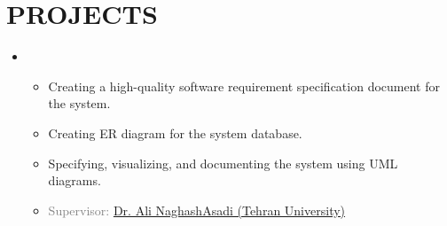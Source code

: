 \documentclass[11pt,letter,sans]{moderncv} %
\begin{document}
\section{PROJECTS}
    \begin{itemize}
        \item 
            \begin{itemize}
                \item Creating a high-quality software requirement specification document for the system.
                \item Creating ER diagram for the system database.
                \item Specifying, visualizing, and documenting the system using UML diagrams.
                \item \textcolor{gray}{Supervisor: \href{https://profile.ut.ac.ir/en/~naghashasadi}{Dr. Ali NaghashAsadi  (Tehran University)}}
            \end{itemize}
        \vspace{0.5em}
        

\end{itemize}
\end{document}
